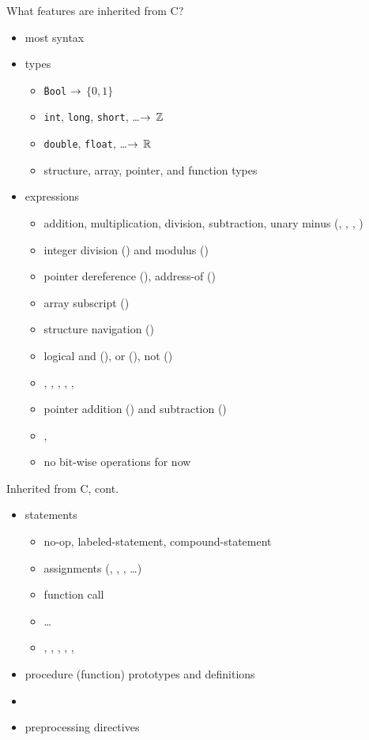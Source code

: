 \documentclass[t]{beamer}
\begin{document}
\begin{frame}{What features are inherited from C?}
  \begin{itemize}
  \item most syntax
  \item types
    \begin{itemize}
    \item \texttt{{\U}Bool} $\rightarrow$ $\{0,1\}$
    \item \texttt{int}, \texttt{long}, \texttt{short}, \ldots $\rightarrow$ $\mathbb{Z}$
    \item \texttt{double}, \texttt{float}, \ldots $\rightarrow$ $\mathbb{R}$
    \item structure, array, pointer, and function types
    \end{itemize}
  \item expressions
    \begin{itemize}
    \item addition, multiplication, division, subtraction, unary minus (\code{+}, 
      \code{*}, \code{/}, \code{-})
    \item integer division (\code{/}) and modulus (\code{\%})
    \item pointer dereference (\code{*}), address-of (\code{\&})
    \item array subscript (\code{[...]})
    \item structure navigation ()
    \item logical and (\code{\&\&}), or (\code{||}), not (\code{!})
    \item \code{==}, \code{!=}, \code{<}, \code{>}, \code{<=}, \code{>=}
    \item pointer addition (\code{+}) and subtraction (\code{-})
    \item \code{++}, \code{--}
    \item \alert{no bit-wise operations} for now
    \end{itemize}
  \end{itemize}
\end{frame}

\begin{frame}{Inherited from C, cont.}
  \begin{itemize}
  \item statements
    \begin{itemize}
    \item no-op, labeled-statement, compound-statement
    \item assignments (\code{=}, \code{+=}, \code{-=}, \ldots)
    \item function call
    \item {}\ldots{}
    \item {}, , , ,
      , 
    \end{itemize}
  \item procedure (function) prototypes and definitions
  \item {}
  \item preprocessing directives
  \end{itemize}
\end{frame}
\end{document}

